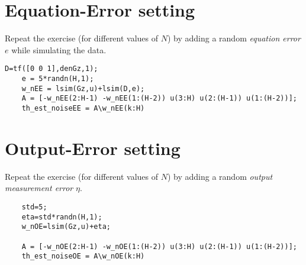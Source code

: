 \section{Equation-Error setting}
Repeat the exercise (for different values of $N$) by adding a random \textit{equation error} $e$ while
simulating the data.

\begin{lstlisting}[style=Matlab-editor] 
    D=tf([0 0 1],denGz,1);
    e = 5*randn(H,1);
    w_nEE = lsim(Gz,u)+lsim(D,e);
    A = [-w_nEE(2:H-1) -w_nEE(1:(H-2)) u(3:H) u(2:(H-1)) u(1:(H-2))];
    th_est_noiseEE = A\w_nEE(k:H) 
\end{lstlisting}

\section{Output-Error setting}
Repeat the exercise (for different values of $N$) by adding a random \textit{output measurement error}
$\eta$.

\begin{lstlisting}[style=Matlab-editor] 
    %simulation in case of Output-Error(OE) setting
    std=5;
    eta=std*randn(H,1);
    w_nOE=lsim(Gz,u)+eta;

    A = [-w_nOE(2:H-1) -w_nOE(1:(H-2)) u(3:H) u(2:(H-1)) u(1:(H-2))];
    th_est_noiseOE = A\w_nOE(k:H)
\end{lstlisting}




